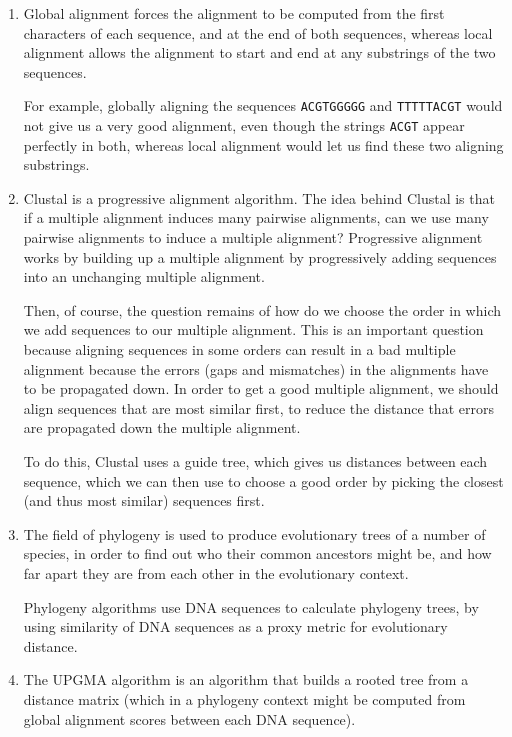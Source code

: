 


\begin{enumerate}[label=(\alph*)]
  \item
    Global alignment forces the alignment to be computed from the first characters of each sequence, and at the end of both sequences, whereas local alignment allows the alignment to start and end at any substrings of the two sequences.

    For example, globally aligning the sequences \texttt{ACGTGGGGG} and \texttt{TTTTTACGT} would not give us a very good alignment, even though the strings \texttt{ACGT} appear perfectly in both, whereas local alignment would let us find these two aligning substrings.

  \item
    Clustal is a progressive alignment algorithm. The idea behind Clustal is that if a multiple alignment induces many pairwise alignments, can we use many pairwise alignments to induce a multiple alignment? Progressive alignment works by building up a multiple alignment by progressively adding sequences into an unchanging multiple alignment.

    Then, of course, the question remains of how do we choose the order in which we add sequences to our multiple alignment. This is an important question because aligning sequences in some orders can result in a bad multiple alignment because the errors (gaps and mismatches) in the alignments have to be propagated down. In order to get a good multiple alignment, we should align sequences that are most similar first, to reduce the distance that errors are propagated down the multiple alignment.

    To do this, Clustal uses a guide tree, which gives us distances between each sequence, which we can then use to choose a good order by picking the closest (and thus most similar) sequences first.

  \item
    The field of phylogeny is used to produce evolutionary trees of a number of species, in order to find out who their common ancestors might be, and how far apart they are from each other in the evolutionary context.

    Phylogeny algorithms use DNA sequences to calculate phylogeny trees, by using similarity of DNA sequences as a proxy metric for evolutionary distance.

  \item
    The UPGMA algorithm is an algorithm that builds a rooted tree from a distance matrix (which in a phylogeny context might be computed from global alignment scores between each DNA sequence).



\end{enumerate}

